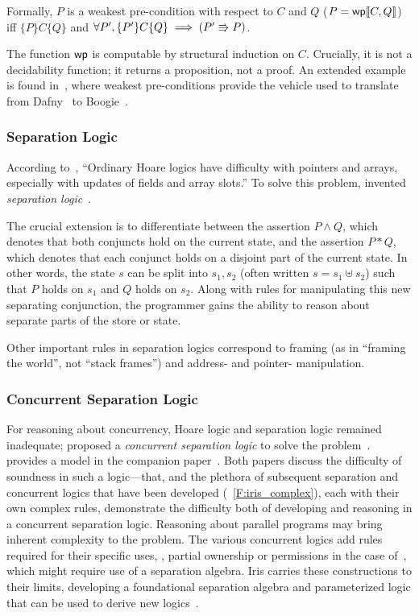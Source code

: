 Formally, \(P\) is a weakest pre-condition with respect to \(C\) and \(Q\) (\(P
= \mathsf{wp}\llbracket C,Q\rrbracket\)) iff \(\{P\} C \{Q\}\) and \(\forall P', \{P'\} C \{Q\} \implies
(P' \mathrel{\Rrightarrow} P)\).

The function \(\mathsf{wp}\) is computable by structural induction on
\(C\). Crucially, it is not a decidability function; it returns a proposition,
not a proof. An extended example is found in~\cite[\S 3]{leino2008specification},
where weakest pre-conditions provide the vehicle used to translate from
Dafny~\cite{leino2010dafny} to Boogie~\cite{Barnett_2006,leino2008this}.

\subsubsection{Separation Logic}

According to~\cite[\S 5]{Appel_2011}, ``Ordinary Hoare logics have difficulty
with pointers and arrays, especially with updates of fields and array slots.''
To solve this problem, \citeauthor{Reynolds} invented \emph{separation
logic}~\cite{Reynolds}.

The crucial extension is to differentiate between the assertion \(P \land Q\),
which denotes that both conjuncts hold on the current state, and the assertion
\(P * Q\), which denotes that each conjunct holds on a disjoint part of the
current state. In other words, the state \(s\) can be split into \(s_1, s_2\)
(often written \(s = s_1 \uplus s_2\)) such that \(P\) holds on \(s_1\) and
\(Q\) holds on \(s_2\). Along with rules for manipulating this new separating
conjunction, the programmer gains the ability to reason about separate parts of
the store or state.

Other important rules in separation logics correspond to framing (as in
``framing the world'', not ``stack frames'') and address- and pointer-
manipulation.

\subsubsection{Concurrent Separation Logic}

For reasoning about concurrency, Hoare logic and separation logic remained
inadequate; \citeauthor{O_Hearn_2007} proposed a \emph{concurrent separation
logic} to solve the problem~\cite{O_Hearn_2007}. \citeauthor{Brookes_2007}
provides a model in the companion paper~\cite{Brookes_2007}. Both papers discuss
the difficulty of soundness in such a logic---that, and the plethora of
subsequent separation and concurrent logics that have been developed
(\figurename~\ref{F:iris_complex}), each with their own complex rules,
demonstrate the difficulty both of developing and reasoning in a concurrent
separation logic. Reasoning about parallel programs may bring inherent
complexity to the problem. The various concurrent logics add rules required for
their specific uses, \eg, partial ownership or permissions in the case
of~\cite{Appel_2011}, which might require use of a separation algebra. Iris
carries these constructions to their limits, developing a foundational
separation algebra and parameterized logic that can be used to derive new
logics~\cite{Jung_2018b}.

